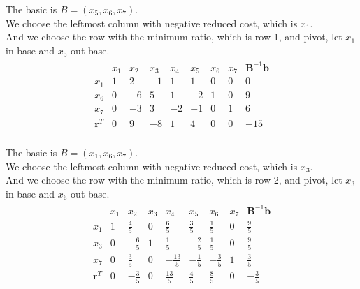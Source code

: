 \documentclass[10pt]{article}
\renewcommand{\mathbf}{\boldsymbol}
\begin{document}
The basic is $B=(x_5,x_6,x_7)$.\\
We choose the leftmost column with negative reduced cost, which is $x_1$.\\
And we choose the row with the minimum ratio, which is row 1, and pivot, let $x_1$ in base and $x_5$ out base.\\

\begin{equation}
	\begin{aligned}
		\begin{array}{c|ccccccc|c}
			& x_1 & x_2 & x_3 & x_4 & x_5 & x_6 & x_7 & \mathbf{B}^{-1}\mathbf{b} \\
			\hline
			x_1 & 1 & 2 & -1 & 1 & 1 & 0 & 0 & 0 \\
			x_6 & 0 & -6 & \boxed{5} & 1 & -2 & 1 & 0 & 9 \\
			x_7 & 0 & -3 & 3 & -2 & -1 & 0 & 1 & 6 \\
			\hline
			\mathbf{r}^T & 0 & 9 & -8 & 1 & 4 & 0 & 0 & -15 \\
		\end{array}
	\end{aligned}
\end{equation}

The basic is $B=(x_1,x_6,x_7)$.\\
We choose the leftmost column with negative reduced cost, which is $x_3$.\\
And we choose the row with the minimum ratio, which is row 2, and pivot, let $x_3$ in base and $x_6$ out base.\\

\begin{equation}
	\begin{aligned}
		\begin{array}{c|ccccccc|c}
			& x_1 & x_2 & x_3 & x_4 & x_5 & x_6 & x_7 & \mathbf{B}^{-1}\mathbf{b} \\
			\hline
			x_1 & 1 & \frac{4}{5} & 0 & \frac{6}{5} & \frac{3}{5} & \frac{1}{5} & 0 & \frac{9}{5} \\
			x_3 & 0 & -\frac{6}{5} & 1 & \frac{1}{5} & -\frac{2}{5} & \frac{1}{5} & 0 & \frac{9}{5} \\
			x_7 & 0 & \boxed{\frac{3}{5}} & 0 & -\frac{13}{5} & -\frac{1}{5} & -\frac{3}{5} & 1 & \frac{3}{5} \\
			\hline
			\mathbf{r}^T & 0 & -\frac{3}{5} & 0 & \frac{13}{5} & \frac{4}{5} & \frac{8}{5} & 0 & -\frac{3}{5} \\
		\end{array}
	\end{aligned}
\end{equation}
\end{document}
